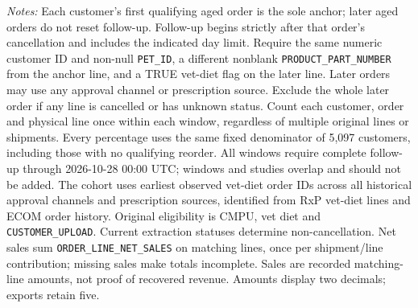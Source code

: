 \begin{table}[!htbp]
\begin{minipage}{\linewidth}
\footnotesize
\textit{Notes:} Each customer's first qualifying aged order is the sole anchor;
later aged orders do not reset follow-up. Follow-up begins strictly after that
order's cancellation and includes the indicated day limit. Require the same numeric customer ID and non-null \texttt{PET\_ID}, a different nonblank \texttt{PRODUCT\_PART\_NUMBER} from the anchor line, and a TRUE vet-diet flag on the later line. Later orders may use any approval channel or prescription
source. Exclude the whole later order if any line is cancelled or has unknown
status. Count each customer, order and physical line once within each window,
regardless of multiple original lines or shipments. Every percentage uses the
same fixed denominator of 5,097 customers, including those with no
qualifying reorder. All windows require complete follow-up through
2026-10-28 00:00 UTC; windows and studies overlap and should not be added.
The cohort uses earliest observed vet-diet order IDs across all historical approval channels and prescription sources, identified from RxP vet-diet lines and ECOM order history. Original eligibility is CMPU,
vet diet and \texttt{CUSTOMER\_UPLOAD}. Current extraction statuses determine
non-cancellation. Net sales sum \texttt{ORDER\_LINE\_NET\_SALES} on matching
lines, once per shipment/line contribution; missing sales make totals incomplete.
Sales are recorded matching-line amounts, not proof of recovered revenue.
Amounts display two decimals; exports retain five.
\end{minipage}
\end{table}
